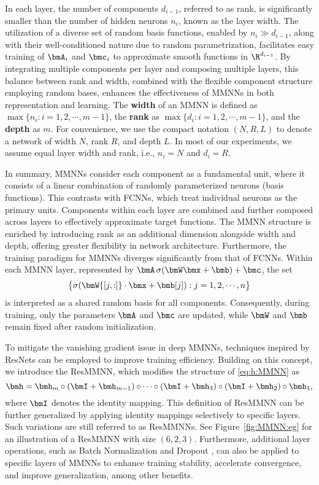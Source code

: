 \documentclass[11pt,a4paper]{article}
\let\dots\cdots
\begin{document}
In each layer, the number of components $d_{i-1}$, referred to as rank, is significantly smaller than the number of hidden neurons $n_i$, known as the layer width. The utilization of a diverse set of random basis functions, enabled by $n_i\gg d_{i-1}$, along with their well-conditioned nature due to random parametrization, facilitates easy training of $\bmA_i$ and $\bmc_i$ to approximate smooth functions in $\R^{d_{i-1}}$. By integrating multiple components per layer and composing multiple layers, this balance between rank and width, combined with the flexible component structure employing random bases, enhances the effectiveness of MMNNs in both representation and learning.
The \textbf{width} of an MMNN is defined as $\max\{n_i : i = 1, 2, \dots, m-1\}$, the \textbf{rank} as $\max\{d_i : i = 1, 2, \dots, m-1\}$, and the \textbf{depth} as $m$. For convenience, we use the compact notation $(N, R, L)$ to denote a network of width $N$, rank $R$, and depth $L$. In most of our experiments, we assume equal layer width and rank, i.e., $n_i=N$ and $d_i=R$.

In summary, MMNNs consider each component as a fundamental unit, where it consists of a linear combination of randomly parameterized neurons (basis functions). This contrasts with FCNNs, which treat individual neurons as the primary units. Components within each layer are combined and further composed across layers to effectively approximate target functions. The MMNN structure is enriched by introducing rank as an additional dimension alongside width and depth, offering greater flexibility in network architecture.
Furthermore, the training paradigm for MMNNs diverges significantly from that of FCNNs. 
Within each MMNN layer, represented by $\bmA \, \sigma(\bmW \bmx + \bmb) + \bmc$, the set
\[
\big\{ \sigma(\bmW{[j,:]} \cdot \bmx + \bmb[j]) : j = 1, 2, \dots, n \big\}
\]
is interpreted as a shared random basis for all components. Consequently, during training, only the parameters $\bmA$ and $\bmc$ are updated, while $\bmW$ and $\bmb$ remain fixed after random initialization.

To mitigate the vanishing gradient issue in deep MMNNs, techniques inspired by ResNets \cite{7780459} can be employed to improve training efficiency. Building on this concept, we introduce the ResMMNN, which modifies the structure of \eqref{eq:h:MMNN} as 
\begin{equation*}
    \bmh = \bmh_m \circ (\bmI + \bmh_{m-1}) \circ \cdots \circ (\bmI + \bmh_3) \circ (\bmI + \bmh_2) \circ \bmh_1,
\end{equation*}
where $\bmI$ denotes the identity mapping. This definition of ResMMNN can be further generalized by applying identity mappings selectively to specific layers. Such variations are still referred to as ResMMNNs. See Figure~\ref{fig:MMNN:eg} for an illustration of a ResMMNN with size $(6,2,3)$. 
Furthermore, additional layer operations, such as Batch Normalization \cite{pmlr-v37-ioffe15} and Dropout \cite{JMLR:v15:srivastava14a}, can also be applied to specific layers of MMNNs to enhance training stability, accelerate convergence, and improve generalization, among other benefits.
\end{document}

